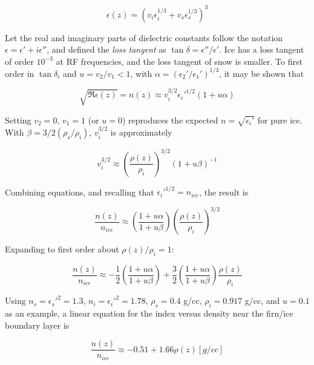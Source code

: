 \documentclass[12pt]{article}
\begin{document}
\begin{equation}
\epsilon(z) = \left( v_i \epsilon_i^{1/3} + v_s \epsilon_s^{1/3} \right)^3
\end{equation}

Let the real and imaginary parts of dielectric constants follow the notation $\epsilon = \epsilon' + i \epsilon''$, and defined the \textit{loss tangent} as $\tan\delta = \epsilon''/\epsilon'$.  Ice has a loss tangent of order $10^{-3}$ at RF frequencies, and the loss tangent of snow is smaller.  To first order in $\tan\delta_i$ and $u = v_2/v_1 < 1$, with $\alpha = (\epsilon_2'/\epsilon_1')^{1/3}$, it may be shown that

\begin{equation}
\sqrt{\Re{\epsilon(z)}} = n(z) \approx v_i^{3/2}\epsilon_i'^{1/2}(1+u\alpha)
\end{equation}

Setting $v_2 = 0$, $v_1 = 1$ (or $u=0$) reproduces the expected $n = \sqrt{\epsilon_i'}$ for pure ice.  With $\beta = 3/2 (\rho_s/\rho_i)$, $v_i^{3/2}$ is approximately

\begin{equation}
v_i^{3/2} \approx \left(\frac{\rho(z)}{\rho_i}\right)^{3/2}(1+u\beta)^{-1}
\end{equation}

Combining equations, and recalling that $\epsilon_i'^{1/2} = n_{ice}$, the result is

\begin{equation}
\frac{n(z)}{n_{ice}} \approx \left( \frac{1+u\alpha}{1+u\beta} \right) \left( \frac{\rho(z)}{\rho_i} \right)^{3/2}
\end{equation}

Expanding to first order about $\rho(z)/\rho_i = 1$:

\begin{equation}
\frac{n(z)}{n_{ice}} \approx -\frac{1}{2}\left( \frac{1+u\alpha}{1+u\beta} \right) + \frac{3}{2}\left( \frac{1+u\alpha}{1+u\beta} \right) \frac{\rho(z)}{\rho_i}
\end{equation}

Using $n_s = \epsilon_s'^2 = 1.3$, $n_i = \epsilon_i'^2 = 1.78$, $\rho_s = 0.4$ g/cc, $\rho_i = 0.917$ g/cc, and $u=0.1$ as an example, a linear equation for the index versus density near the firn/ice boundary layer is

\begin{equation}
\frac{n(z)}{n_{ice}} \approx -0.51 + 1.66 \rho(z) [g/cc]
\end{equation}
\end{document}
